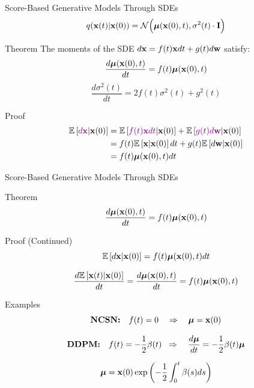 \documentclass{beamer}
\renewcommand{\eqpause}{}
\renewcommand{\nextonslide}[1]{#1}
\begin{document}
\begin{frame}{Score-Based Generative Models Through SDEs}
	\[
		q(\mathbf{x}(t) | \mathbf{x}(0)) = \mathcal{N}\Bigl(\boldsymbol{\mu}(\mathbf{x}(0), t), \sigma^2(t) \cdot \mathbf{I}\Bigr)
	\]
	\vspace{-0.5cm}
	\begin{block}{Theorem}
		The moments of the SDE $d\mathbf{x} = f(t) \mathbf{x} dt + g(t) d \mathbf{w}$ satisfy:
		\[
			\frac{d \boldsymbol{\mu}(\mathbf{x}(0), t)}{dt} = f(t) \boldsymbol{\mu}(\mathbf{x}(0), t)
		\]
		\[
			\frac{d \sigma^2(t)}{dt} = 2 f(t) \sigma^2(t) + g^2(t)
		\]
	\end{block}
    \eqpause
	\begin{block}{Proof}
		\vspace{-0.7cm}
		\begin{align*}
			\bbE\left[{\color{violet}d\bx} | \bx(0) \right] &= \bbE\left[{\color{violet}f(t) \bx dt} | \bx(0) \right] + \bbE\left[{\color{violet}g(t) d \bw} | \bx(0) \right]
			\nextonslide{\\ &= f(t) \bbE\left[\bx | \bx(0) \right] dt + g(t) \bbE\left[d \bw | \bx(0) \right]}
			\nextonslide{\\ &= f(t) \bmu(\bx(0), t) dt}
		\end{align*}
	\end{block}
\end{frame}
\begin{frame}{Score-Based Generative Models Through SDEs}
	\begin{block}{Theorem}
		\vspace{-0.3cm}
		\[
			\frac{d \boldsymbol{\mu}(\mathbf{x}(0), t)}{dt} = f(t) \boldsymbol{\mu}(\mathbf{x}(0), t)
		\]
		\vspace{-0.5cm}
	\end{block}
    \eqpause
	\begin{block}{Proof (Continued)}
		\vspace{-0.3cm}
		\[
			\mathbb{E}\left[d\mathbf{x} | \mathbf{x}(0) \right] = f(t) \boldsymbol{\mu}(\mathbf{x}(0), t) dt
		\]
        \eqpause
		\[
			\frac{d \mathbb{E}\left[\mathbf{x}(t) | \mathbf{x}(0) \right]}{dt} = \frac{d \boldsymbol{\mu}(\mathbf{x}(0), t)}{dt} = f(t) \boldsymbol{\mu}(\mathbf{x}(0), t) 
		\]
	\end{block}
    \eqpause
	\vspace{-0.3cm}
	\begin{block}{Examples}
		\vspace{-0.5cm}
		\[
			\textbf{NCSN:}\quad	f(t) = 0 \quad \Rightarrow \quad \boldsymbol{\mu} = \mathbf{x}(0)
		\]
        \eqpause
		\vspace{-0.5cm}
		\[
			\textbf{DDPM:}\quad f(t) = - \frac{1}{2} \beta(t)\;\;   \Rightarrow\quad \frac{d \boldsymbol{\mu}}{dt} = - \frac{1}{2} \beta(t) \boldsymbol{\mu}
		\]
        \eqpause
		\vspace{-0.3cm}
		\[
			\boldsymbol{\mu} = \mathbf{x}(0) \exp\left(- \frac{1}{2} \int_0^t \beta(s)ds\right)
		\]
	\end{block}
\end{frame}
\end{document}
